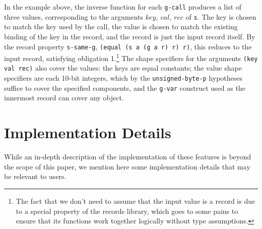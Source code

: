\documentclass[submission,copyright,creativecommons]{eptcs}
\newcommand*{\var}[1]{\mathit{#1}}
\begin{document}
In the example above, the inverse function for each \texttt{g-call}
produces a list of three values, corresponding to the arguments
$\var{key}$, $\var{val}$, $\var{rec}$ of \texttt{s}.  The key is
chosen to match the key used by the call, the value is chosen to match
the existing binding of the key in the record, and the record is just
the input record itself.  By the record property \texttt{s-same-g},
\texttt{(equal (s a (g a r) r) r)}, this reduces to the input record,
satisfying obligation 1.\footnote{The fact that we don't need to
  assume that the input value is a record is due to a special property
  of the records library, which goes to some pains to ensure that its
  functions work together logically without type assumptions.}  The
shape specifiers for the arguments \texttt{(key val rec)} also cover the
values: the keys are equal constants; the value shape specifiers are each
10-bit integers, which by the \texttt{unsigned-byte-p} hypotheses
suffice to cover the specified components, and the \texttt{g-var}
construct used as the innermost record can cover any object.

\section{Implementation Details}
\label{sec:details}


While an in-depth description of the implementation of these features
is beyond the scope of this paper, we mention here some implementation
details that may be relevant to users.
\end{document}
